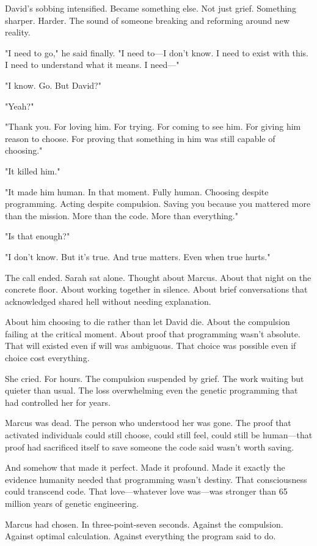 David's sobbing intensified. Became something else. Not just grief. Something sharper. Harder. The sound of someone breaking and reforming around new reality.

"I need to go," he said finally. "I need to—I don't know. I need to exist with this. I need to understand what it means. I need—"

"I know. Go. But David?"

"Yeah?"

"Thank you. For loving him. For trying. For coming to see him. For giving him reason to choose. For proving that something in him was still capable of choosing."

"It killed him."

"It made him human. In that moment. Fully human. Choosing despite programming. Acting despite compulsion. Saving you because you mattered more than the mission. More than the code. More than everything."

"Is that enough?"

"I don't know. But it's true. And true matters. Even when true hurts."

The call ended. Sarah sat alone. Thought about Marcus. About that night on the concrete floor. About working together in silence. About brief conversations that acknowledged shared hell without needing explanation.

About him choosing to die rather than let David die. About the compulsion failing at the critical moment. About proof that programming wasn't absolute. That will existed even if will was ambiguous. That choice was possible even if choice cost everything.

She cried. For hours. The compulsion suspended by grief. The work waiting but quieter than usual. The loss overwhelming even the genetic programming that had controlled her for years.

Marcus was dead. The person who understood her was gone. The proof that activated individuals could still choose, could still feel, could still be human—that proof had sacrificed itself to save someone the code said wasn't worth saving.

And somehow that made it perfect. Made it profound. Made it exactly the evidence humanity needed that programming wasn't destiny. That consciousness could transcend code. That love—whatever love was—was stronger than 65 million years of genetic engineering.

Marcus had chosen. In three-point-seven seconds. Against the compulsion. Against optimal calculation. Against everything the program said to do.

